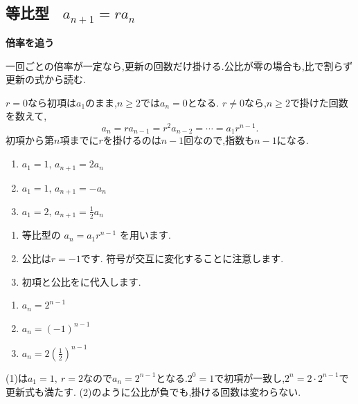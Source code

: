 
  \subsection{\texorpdfstring{等比型 \, $a_{n+1}=ra_n$}{等比型}}\label{節：等比型}
  \begin{bookpoint}
    \textbf{倍率を追う}\par
    一回ごとの倍率が一定なら,更新の回数だけ掛ける.公比が零の場合も,比で割らず更新の式から読む.
  \end{bookpoint}
    $r=0$なら初項は$a_1$のまま,$n\ge2$では$a_n=0$となる.
    $r\ne0$なら,$n\ge2$で掛けた回数を数えて,
    \[
      a_n=ra_{n-1}=r^2a_{n-2}=\cdots=a_1r^{n-1}.
    \]
    初項から第$n$項までに$r$を掛けるのは$n-1$回なので,指数も$n-1$になる.

    \noindent {}\par\nobreak
    \begin{enumerate}[label=(\arabic*),parsep=3pt,format=\bookitemlink{example-geometric-1}{problem}{answer}]
      \item $\displaystyle a_1=1,\, a_{n+1}=2a_n$
      \item $\displaystyle a_1=1,\, a_{n+1}=-a_n$
      \item $\displaystyle a_1=2,\, a_{n+1}=\frac{1}{2}a_n$
    \end{enumerate}

    \noindent{}\par\nobreak
    \begin{enumerate}[label=(\arabic*),parsep=3pt,format=\bookitemlink{example-geometric-1}{hint}{problem}]
      \item 等比型の
            $\displaystyle a_n=a_1r^{n-1}$
            を用います.
      \item 公比は$r=-1$です.
            符号が交互に変化することに注意します.
      \item 初項と公比をに代入します.
    \end{enumerate}

    \noindent{}\par\nobreak
    \begin{enumerate}[label=(\arabic*),parsep=3pt,format=\bookitemlink{example-geometric-1}{answer}{problem}]
      \item $\displaystyle a_n=2^{n-1}$
      \item $\displaystyle a_n=(-1)^{n-1}$
      \item $\displaystyle a_n=2\left(\frac12\right)^{n-1}$
    \end{enumerate}

    \noindent{}\par\nobreak
    (1)は$a_1=1,\ r=2$なので$a_n=2^{n-1}$となる.$2^0=1$で初項が一致し,$2^n=2\cdot2^{n-1}$で更新式も満たす.
    (2)のように公比が負でも,掛ける回数は変わらない.
